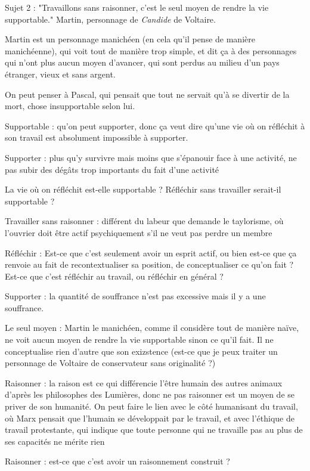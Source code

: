 \documentclass[a4paper,12pt]{book}
\begin{document}
\par Sujet 2 : "Travaillons sans raisonner, c'est le seul moyen de rendre la vie supportable." Martin, personnage de \textit{Candide} de Voltaire.
\par Martin est un personnage manichéen (en cela qu'il pense de manière manichéenne), qui voit tout de manière trop simple, et dit ça à des personnages qui n'ont plus aucun moyen d'avancer, qui sont perdus au milieu d'un pays étranger, vieux et sans argent.
\par On peut penser à Pascal, qui pensait que tout ne servait qu'à se divertir de la mort, chose insupportable selon lui.
\par Supportable : qu'on peut supporter, donc ça veut dire qu'une vie où on réfléchit à son travail est absolument impossible à supporter.
\par Supporter : plus qu'y survivre mais moins que s'épanouir face à une activité, ne pas subir des dégâts trop importants du fait d'une activité
\par La vie où on réfléchit est-elle supportable ? Réfléchir sans travailler serait-il supportable ?
\par Travailler sans raisonner : différent du labeur que demande le taylorisme, où l'ouvrier doit être actif psychiquement s'il ne veut pas perdre un membre
\par Réfléchir : Est-ce que c'est seulement avoir un esprit actif, ou bien est-ce que ça renvoie au fait de recontextualiser sa position, de conceptualiser ce qu'on fait ? Est-ce que c'est réfléchir au travail, ou réfléchir en général ?
\par Supporter : la quantité de souffrance n'est pas excessive mais il y a une souffrance.
\par Le seul moyen : Martin le manichéen, comme il considère tout de manière naïve, ne voit aucun moyen de rendre la vie supportable sinon ce qu'il fait. Il ne conceptualise rien d'autre que son exizstence (est-ce que je peux traiter un personnage de Voltaire de conservateur sans originalité ?)
\par Raisonner : la raison est ce qui différencie l'être humain des autres animaux d'après les philosophes des Lumières, donc ne pas raisonner est un moyen de se priver de son humanité. On peut faire le lien avec le côté humanisant du travail, où Marx pensait que l'humain se développait par le travail, et avec l'éthique de travail protestante, qui indique que toute personne qui ne travaille pas au plus de ses capacités ne mérite rien
\par Raisonner : est-ce que c'est avoir un raisonnement construit ?
\end{document}
